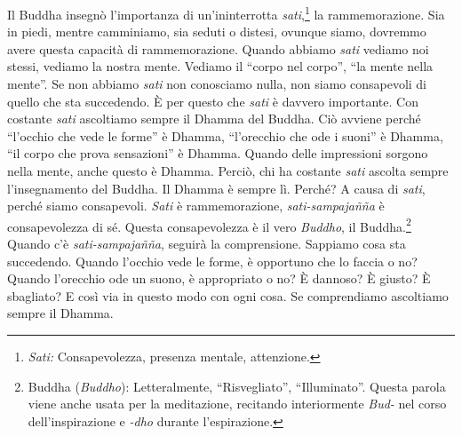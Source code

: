 Il Buddha insegnò l'importanza di un'ininterrotta \emph{sati},\footnote{\emph{Sati:}
  Consapevolezza, presenza mentale, attenzione.} la rammemorazione. Sia
in piedi, mentre camminiamo, sia seduti o distesi, ovunque siamo,
dovremmo avere questa capacità di rammemorazione. Quando abbiamo
\emph{sati} vediamo noi stessi, vediamo la nostra mente. Vediamo il
``corpo nel corpo'', ``la mente nella mente''. Se non abbiamo
\emph{sati} non conosciamo nulla, non siamo consapevoli di quello che
sta succedendo. È per questo che \emph{sati} è davvero importante. Con
costante \emph{sati} ascoltiamo sempre il Dhamma del Buddha. Ciò avviene
perché ``l'occhio che vede le forme'' è Dhamma, ``l'orecchio che ode i
suoni'' è Dhamma, ``il corpo che prova sensazioni'' è Dhamma. Quando
delle impressioni sorgono nella mente, anche questo è Dhamma. Perciò,
chi ha costante \emph{sati} ascolta sempre l'insegnamento del Buddha. Il
Dhamma è sempre lì. Perché? A causa di \emph{sati}, perché siamo
consapevoli. \emph{Sati} è rammemorazione, \emph{sati-sampajañña} è
consapevolezza di sé. Questa consapevolezza è il vero \emph{Buddho}, il
Buddha.\footnote{Buddha (\emph{Buddho}): Letteralmente, ``Risvegliato'',
  ``Illuminato''. Questa parola viene anche usata per la meditazione,
  recitando interiormente \emph{Bud-} nel corso dell'inspirazione e
  \emph{-dho} durante l'espirazione.} Quando c'è \emph{sati-sampajañña},
seguirà la comprensione. Sappiamo cosa sta succedendo. Quando l'occhio
vede le forme, è opportuno che lo faccia o no? Quando l'orecchio ode un
suono, è appropriato o no? È dannoso? È giusto? È sbagliato? E così via
in questo modo con ogni cosa. Se comprendiamo ascoltiamo sempre il
Dhamma.

